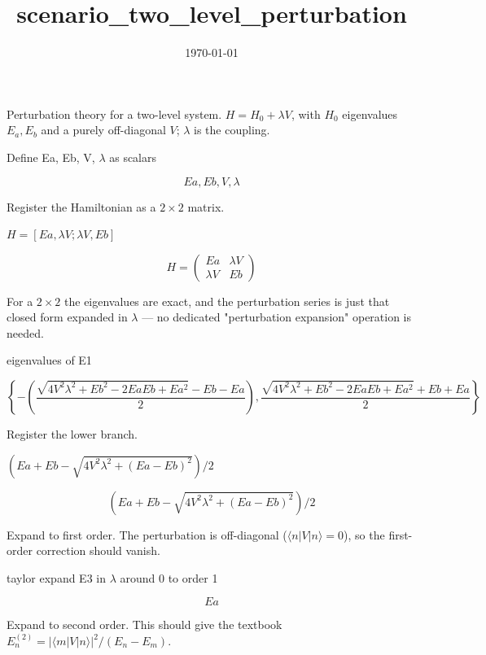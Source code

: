 \documentclass[dvipdfmx]{article}
\title{scenario\_two\_level\_perturbation}
\date{\today}
\begin{document}
\maketitle

Perturbation theory for a two-level system. $H=H_0+\lambda V$, with $H_0$ eigenvalues $E_a, E_b$ and a purely off-diagonal $V$; $\lambda$ is the coupling.

Define Ea, Eb, V, $\lambda$ as scalars

\[
  Ea, Eb, V, \lambda
\]

Register the Hamiltonian as a $2\times2$ matrix.

$H = [Ea, \lambda V; \lambda V, Eb]$

\begin{equation}
  H = \begin{pmatrix} Ea & \lambda V \\ \lambda V & Eb \end{pmatrix}
  \label{eq:E1}
\end{equation}

For a $2\times2$ the eigenvalues are exact, and the perturbation series is just that closed form expanded in $\lambda$ — no dedicated "perturbation expansion" operation is needed.

eigenvalues of E1

\begin{equation}
  \left\{ -\left(\frac{\sqrt{4 V^2 \lambda^2+Eb^2-2 Ea Eb+Ea^2}-Eb-Ea}{2}\right) , \frac{\sqrt{4 V^2 \lambda^2+Eb^2-2 Ea Eb+Ea^2}+Eb+Ea}{2} \right\}
  \label{eq:E2}
\end{equation}

Register the lower branch.

$(Ea + Eb - \sqrt{4 V^2 \lambda^2 + (Ea-Eb)^2})/2$

\begin{equation}
  (Ea + Eb - \sqrt{4 V^2 \lambda^2 + (Ea-Eb)^2})/2
  \label{eq:E3}
\end{equation}

Expand to first order. The perturbation is off-diagonal ($\langle n|V|n\rangle=0$), so the first-order correction should vanish.

taylor expand E3 in $\lambda$ around 0 to order 1

\begin{equation}
  Ea
  \label{eq:E4}
\end{equation}

Expand to second order. This should give the textbook $E^{(2)}_n=|\langle m|V|n\rangle|^2/(E_n-E_m)$.
\end{document}
